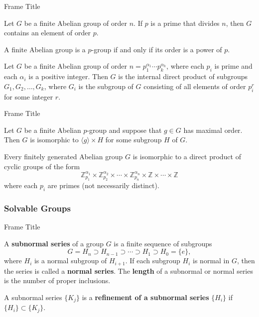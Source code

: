 \documentclass{beamer}
\begin{document}
\begin{frame}{Frame Title}
    \begin{lemma}
        \justifying
        Let $G$ be a finite Abelian group of order $n$. If $p$ is a prime that divides $n$, then $G$ contains an element of order $p$.
    \end{lemma}
    \pause
    \begin{lemma}
        \justifying
        A finite Abelian group is a $p$-group if and only if its order is a power of $p$.
    \end{lemma}
    \pause
    \begin{lemma}
        \justifying
        Let $G$ be a finite Abelian group of order $n = p_1^{\alpha_1}\cdots p_k^{\alpha_k}$, where each $p_i$ is prime and each $\alpha_i$ is a positive integer. Then $G$ is the internal direct product of subgroups $G_1, G_2, \dots, G_k$, where $G_i$ is the subgroup of $G$ consisting of all elements of order $p_i^r$ for some integer $r$.
    \end{lemma}
\end{frame}

\begin{frame}{Frame Title}
    \begin{lemma}
        \justifying
        Let $G$ be a finite Abelian $p$-group and suppose that $g \in G$ has maximal order. Then $G$ is isomorphic to $\langle g\rangle \times H$ for some subgroup $H$ of $G$.
    \end{lemma}
    \pause
    \begin{theorem}
        \justifying
        Every finitely generated Abelian group $G$ is isomorphic to a direct product of cyclic groups of the form
        \[\mathbb{Z}_{p_1}^{\alpha_1} \times \mathbb{Z}_{p_2}^{\alpha_2} \times \cdots \times \mathbb{Z}_{p_n}^{\alpha_n} \times \mathbb{Z} \times \cdots \times \mathbb{Z}\]
        where each $p_i$ are primes (not necessarily distinct).
    \end{theorem}
\end{frame}

\subsubsection{Solvable Groups}

\begin{frame}{Frame Title}
    \begin{definition}
        \justifying
        A \textbf{subnormal series} of a group $G$ is a finite sequence of subgroups
        \[G = H_n \supset H_{n-1} \supset \cdots \supset H_1 \supset H_0 = \{e\},\]
        where $H_i$ is a normal subgroup of $H_{i+1}$. If each subgroup $H_i$ is normal in $G$, then the series is called a \textbf{normal series}. The \textbf{length} of a subnormal or normal series is the number of proper inclusions.
    \end{definition}
    \pause
    \begin{definition}
        A subnormal series $\{K_j\}$ is a \textbf{refinement of a subnormal series} $\{H_i\}$ if $\{H_i\} \subset \{K_j\}$.
    \end{definition}
\end{frame}
\end{document}
